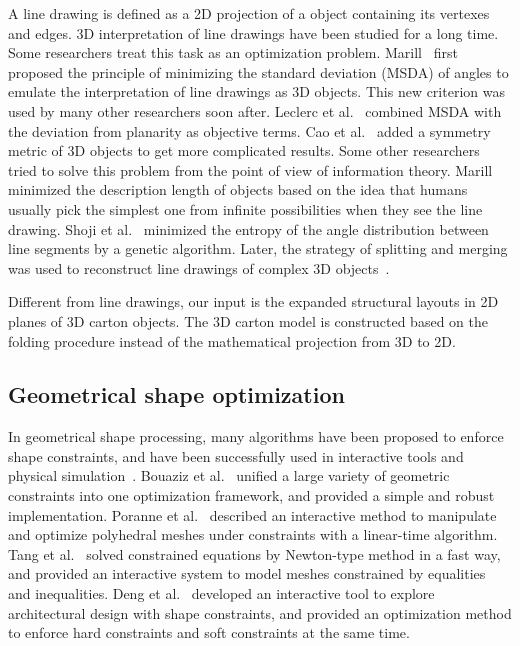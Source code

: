 A line drawing is defined as a 2D projection of a object containing its vertexes and edges. 3D interpretation of line drawings have been studied for a long time. 
Some researchers treat this task as an optimization problem. 
Marill~\cite{Marill:1991:EHI:113057.113061} first proposed the principle of minimizing the standard deviation (MSDA) of angles to emulate the interpretation of line drawings as 3D objects. 
%
This new criterion was used by many other researchers soon after. 
Leclerc et al.~\cite{Leclerc1992An} combined MSDA with the deviation from planarity as objective terms. 
Cao et al.~\cite{Cao:2005:ORS:1097114.1097658} added a symmetry metric of 3D objects to get more complicated results. 
Some other researchers tried to solve this problem from the point of view of information theory.
%
Marill~\cite{Marill1992Why} minimized the description length of objects based on the idea that humans usually pick the simplest one from infinite possibilities when they see the line drawing. 
Shoji et al.~\cite{Shoji20013} minimized the entropy of the angle distribution between line segments by a genetic algorithm. 
Later, the strategy of splitting and merging was used to reconstruct line drawings of complex 3D objects~\cite{10.1109/TPAMI.2010.49,10.1109/CVPR.2014.94}.   
		 
Different from line drawings, our input is the expanded structural layouts in 2D planes of 3D carton objects.
The 3D carton model is constructed based on the folding procedure instead of the mathematical projection from 3D to 2D.

\subsection{Geometrical shape optimization}
In geometrical shape processing, many algorithms have been proposed to enforce shape constraints, and have been successfully used in interactive tools and physical simulation~\cite{Botsch:2006:PCP:1281957.1281959,Igarashi:2005:ASM:1186822.1073323}. 
Bouaziz et al.~\cite{Bouaziz:2012:SSD:2346796.2346802} unified a large variety of geometric constraints into one optimization framework, and provided a simple and robust implementation. 
Poranne et al.~\cite{Poranne2013Interactive} described an interactive method to manipulate and optimize polyhedral meshes under constraints with a linear-time algorithm. 
%
Tang et al.~\cite{Tang:2014:FPM:2601097.2601213} solved constrained equations by Newton-type method in a fast way, and provided an interactive system to model meshes constrained by equalities and inequalities. 
Deng et al.~\cite{Deng2015} developed an interactive tool to explore architectural design with shape constraints, and provided an optimization method to enforce hard constraints and soft constraints at the same time. 

